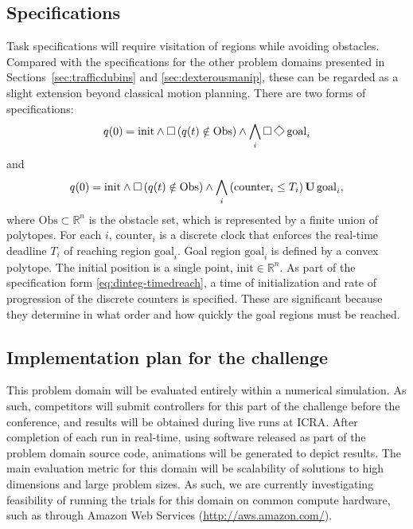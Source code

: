 \documentclass{amsart}
\theoremstyle{definition}
\begin{document}
\subsection{Specifications}

Task specifications will require visitation of regions while avoiding obstacles.
Compared with the specifications for the other problem domains presented in
Sections~\ref{sec:trafficdubins} and \ref{sec:dexterousmanip}, these can be
regarded as a slight extension beyond classical motion planning.  There are two
forms of specifications:
\begin{equation}\label{eq:dinteg-surveillance}
q(0) = \mathrm{init} \wedge \Galways \left( q(t) \notin \mathrm{Obs} \right) \wedge \bigwedge_{i} \Galways \Feventually \mathrm{goal}_i
\end{equation}
and
\begin{equation}\label{eq:dinteg-timedreach}
q(0) = \mathrm{init} \wedge \operatorname{\Box} \left( q(t) \notin \mathrm{Obs} \right) \wedge \bigwedge_{i} \left( \mathrm{counter}_i \leq T_{i} \right) \operatorname{\mathbf{U}} \mathrm{goal}_i ,
\end{equation}
where $\mathrm{Obs} \subset \mathbb{R}^n$ is the obstacle set, which is
represented by a finite union of polytopes.  For each $i$, $\mathrm{counter}_i$
is a discrete clock that enforces the real-time deadline $T_i$ of reaching
region $\mathrm{goal}_i$.  Goal region $\mathrm{goal}_i$ is defined by a convex
polytope.  The initial position is a single point, $\mathrm{init}\in
\mathbb{R}^n$.  As part of the specification form \eqref{eq:dinteg-timedreach},
a time of initialization and rate of progression of the discrete counters is
specified.  These are significant because they determine in what order and how
quickly the goal regions must be reached.

\subsection{Implementation plan for the challenge}

This problem domain will be evaluated entirely within a numerical simulation.
As such, competitors will submit controllers for this part of the challenge
before the conference, and results will be obtained during live runs at ICRA.
After completion of each run in real-time, using software released as part of
the problem domain source code, animations will be generated to depict results.
The main evaluation metric for this domain will be scalability of solutions to
high dimensions and large problem sizes. As such, we are currently investigating
feasibility of running the trials for this domain on common compute hardware,
such as through Amazon Web Services (\url{http://aws.amazon.com/}).
\end{document}
